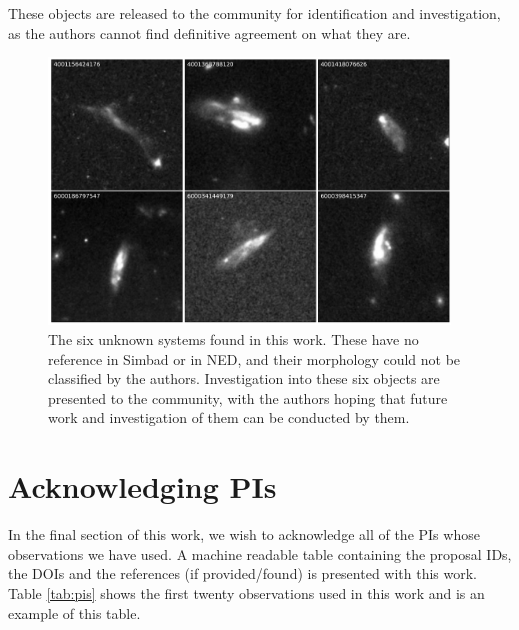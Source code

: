 These objects are released to the community for identification and investigation, as the authors cannot find definitive agreement on what they are. 

\begin{figure}
  \centering
  \includegraphics[width = 0.95\textwidth]{Chapter2/figures/fig17.pdf}
  \caption{The six unknown systems found in this work. These have no reference in Simbad or in NED, and their morphology could not be classified by the authors. Investigation into these six objects are presented to the community, with the authors hoping that future work and investigation of them can be conducted by them.}
  \label{fig:unknown-images}
\end{figure}

\section{Acknowledging PIs}
\noindent In the final section of this work, we wish to acknowledge all of the PIs whose observations we have used. A machine readable table containing the proposal IDs, the DOIs and the references (if provided/found) is presented with this work. Table \ref{tab:pis} shows the first twenty observations used in this work and is an example of this table.

